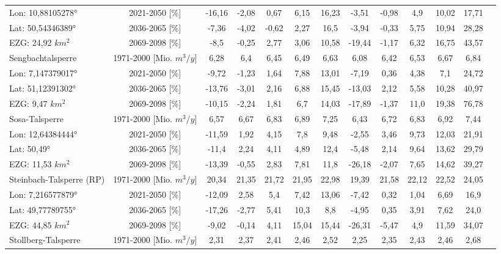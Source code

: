 \begin{longtable}{@{\extracolsep{\fill}}lc|ccccc||cccccc}
\cline{2-13} 
Lon: 10,88105278° & 2021-2050 [\%]  & -16,16 & -2,08 & 0,67 & 6,15 & 16,23 & -3,51 & -0,98 & 4,9 & 10,02 & 17,71 & \\ 
Lat: 50,54346389° & 2036-2065 [\%]  & -7,36 & -4,02 & -0,62 & 2,27 & 16,5 & -3,94 & -0,33 & 5,75 & 10,94 & 28,28 & \\ 
EZG: 24,92 $km^2$ & 2069-2098 [\%]  & -8,5 & -0,25 & 2,77 & 3,06 & 10,58 & -19,44 & -1,17 & 6,32 & 16,75 & 43,57 & \\ 
\hline 
Sengbachtalsperre & 1971-2000 [Mio. $m^3/y$]  & 6,28 & 6,4 & 6,45 & 6,49 & 6,63 & 6,08 & 6,42 & 6,53 & 6,67 & 6,84 & \\ 
\cline{2-13} 
Lon: 7,147379017° & 2021-2050 [\%]  & -9,72 & -1,23 & 1,64 & 7,88 & 13,01 & -7,19 & 0,36 & 4,38 & 7,1 & 24,72 & \\ 
Lat: 51,12391302° & 2036-2065 [\%]  & -13,76 & -3,01 & 2,16 & 6,88 & 15,45 & -13,03 & 2,12 & 5,58 & 10,28 & 40,97 & \\ 
EZG: 9,47 $km^2$ & 2069-2098 [\%]  & -10,15 & -2,24 & 1,81 & 6,7 & 14,03 & -17,89 & -1,37 & 11,0 & 19,38 & 76,78 & \\ 
\hline 
Sosa-Talsperre & 1971-2000 [Mio. $m^3/y$]  & 6,57 & 6,67 & 6,83 & 6,89 & 7,25 & 6,43 & 6,72 & 6,83 & 6,92 & 7,44 & \\ 
\cline{2-13} 
Lon: 12,64384444° & 2021-2050 [\%]  & -11,59 & 1,92 & 4,15 & 7,8 & 9,48 & -2,55 & 3,46 & 9,73 & 12,03 & 21,91 & \\ 
Lat: 50,49° & 2036-2065 [\%]  & -11,4 & 2,24 & 4,11 & 4,89 & 12,4 & -5,48 & 2,14 & 9,64 & 13,62 & 29,79 & \\ 
EZG: 11,53 $km^2$ & 2069-2098 [\%]  & -13,39 & -0,55 & 2,83 & 7,81 & 11,8 & -26,18 & -2,07 & 7,65 & 14,62 & 39,27 & \\ 
\hline 
Steinbach-Talsperre (RP) & 1971-2000 [Mio. $m^3/y$]  & 20,34 & 21,35 & 21,72 & 21,95 & 22,98 & 19,39 & 21,58 & 22,12 & 22,52 & 24,05 & \\ 
\cline{2-13} 
Lon: 7,216577879° & 2021-2050 [\%]  & -12,09 & 2,58 & 5,4 & 7,42 & 13,06 & -7,42 & 0,32 & 1,04 & 6,69 & 16,9 & \\ 
Lat: 49,77789755° & 2036-2065 [\%]  & -17,26 & -2,77 & 5,41 & 10,3 & 8,8 & -4,95 & 0,35 & 3,91 & 7,62 & 24,0 & \\ 
EZG: 44,85 $km^2$ & 2069-2098 [\%]  & -9,02 & -0,14 & 4,11 & 15,04 & 15,44 & -26,31 & -5,47 & 4,9 & 11,59 & 34,07 & \\ 
\hline 
Stollberg-Talsperre & 1971-2000 [Mio. $m^3/y$]  & 2,31 & 2,37 & 2,41 & 2,46 & 2,52 & 2,25 & 2,35 & 2,43 & 2,46 & 2,68 & \\ 

\end{longtable}
